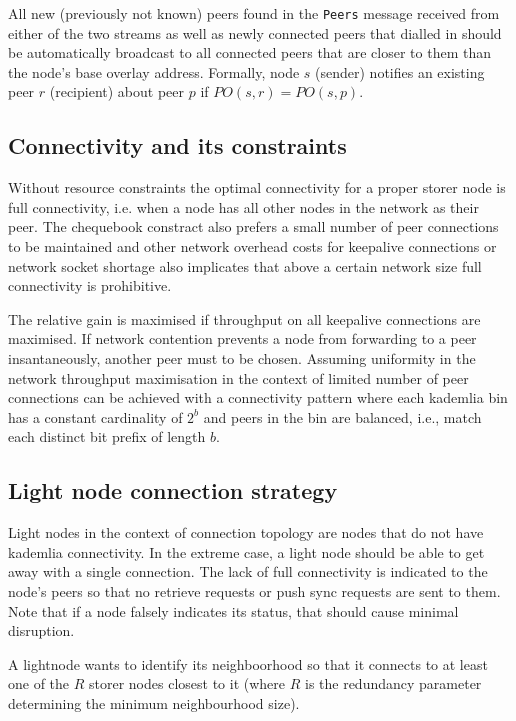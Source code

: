 
All new (previously not known) peers found in the \lstinline{Peers} message received from either of the two streams as well as newly connected peers that dialled in should be automatically broadcast to all connected peers that are closer  to them than the node's base overlay address. Formally, 
node $s$ (sender) notifies an existing peer $r$ (recipient) about peer $p$ if $\mathit{PO}(s, r) = \mathit{PO}(s, p)$. 

\subsection{Connectivity and its constraints}

Without resource constraints the optimal connectivity for a proper storer node is full  connectivity, i.e. when a node has all other nodes in the network as their peer. The chequebook constract also prefers a small number of peer connections to be maintained and other network overhead costs for keepalive connections or network socket shortage also implicates that 
above a certain network size full connectivity is prohibitive.

The relative gain is maximised if throughput on all keepalive connections are maximised. If network contention prevents a node from forwarding to a peer insantaneously, another peer must to be chosen. 
Assuming uniformity in the network 
throughput maximisation in the context of limited number of peer connections can be achieved with a connectivity pattern where each kademlia bin has a constant cardinality of $2^b$ and peers in the bin are balanced, i.e., match each distinct bit prefix of length $b$. 

\subsection{Light node connection strategy}

Light nodes in the context of connection topology are nodes that do not have kademlia connectivity. In the extreme case, a light node should be able to get away with a single connection. The lack of full connectivity is indicated to the node's peers so that no retrieve requests or  push sync requests are sent to them. Note that if a node falsely indicates its status, that should cause minimal disruption. 

A lightnode wants to identify its neighboorhood so that it connects to at least one of the $R$ storer nodes closest to it (where $R$ is the redundancy parameter determining the minimum neighbourhood size).



